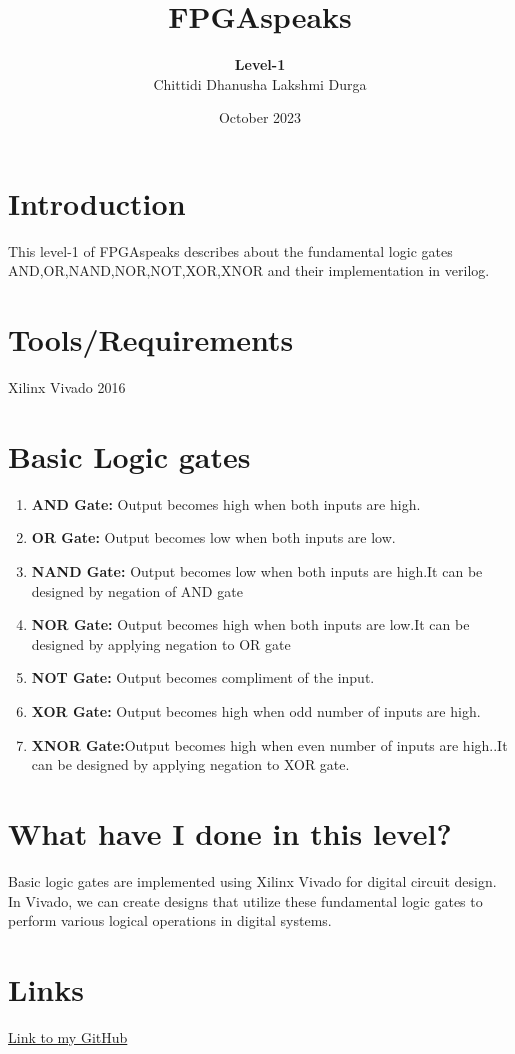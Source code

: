 \documentclass[12pt]{article}
\title{\textbf{FPGAspeaks}}
\author{\textbf{Level-1} \\  Chittidi Dhanusha Lakshmi Durga }
\date{October 2023}
\begin{document}
\maketitle


\section{Introduction}
This level-1 of  FPGAspeaks describes about the fundamental logic gates\\ AND,OR,NAND,NOR,NOT,XOR,XNOR and their implementation in verilog.

\section{Tools/Requirements}
 Xilinx Vivado  2016
 \section{Basic Logic gates}
 \begin{enumerate}[label=\roman*.] %
\item \textbf{AND Gate:} Output becomes high when both inputs are high.
\item \textbf{OR Gate:} Output becomes low when both inputs are low.
\item \textbf{NAND Gate:} Output becomes low when both inputs are high.It can  be designed by negation of AND gate 
\item \textbf{NOR Gate:} Output becomes high when both inputs are low.It can  be designed by applying negation to OR gate 
\item \textbf{NOT Gate:} Output becomes compliment of the input.
\item \textbf{XOR Gate:} Output becomes high when odd number of inputs are high.
\item \textbf{XNOR Gate:}Output becomes high when even number of inputs are high..It can  be designed by applying negation to XOR gate. 
\end{enumerate}
\section{What have I done in this level?}
 Basic logic gates are implemented using Xilinx Vivado for digital circuit design. In Vivado, we can create designs that utilize these fundamental logic gates to perform various logical operations in digital systems.
\section{Links}
\href{https://github.com/Dhanusha-Chittidi/FPGAspeaks}{Link to my GitHub}
\end{document}
